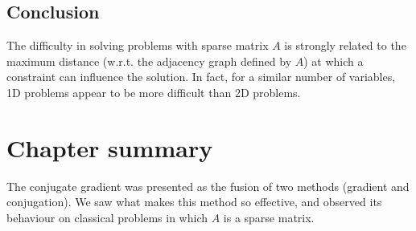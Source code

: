 \documentclass[notitlepage,oneside]{book}
\begin{document}
\subsection{Conclusion}

The difficulty in solving problems with sparse matrix $A$ is strongly related to the maximum distance (w.r.t. the adjacency graph defined by $A$) at which a constraint can influence the solution.
In fact, for a similar number of variables, 1D problems appear to be more difficult than 2D problems.

\section{Chapter summary}
The conjugate gradient was presented as the fusion of two methods (gradient and conjugation). 
We saw what makes this method so effective, and observed its behaviour on classical problems in which $A$ is a sparse matrix. 

\vspace{6mm}
\end{document}
